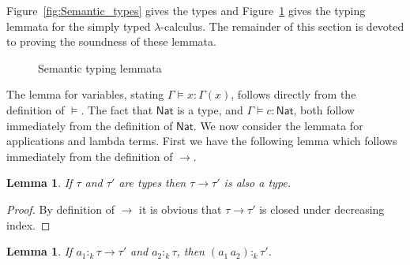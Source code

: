 \documentclass[10pt,a4paper,final,twocolumn]{article}
\theoremstyle{definition}
\theoremstyle{plain}
\newtheorem{lemma}[definition]{Lemma}
\newcommand{\abstr}[2]{\ensuremath{\lambda{#1}.\,{#2}}}
\newcommand{\app}[2]{\ensuremath{{#1}\,{#2}}}
\newcommand{\Nat}{\ensuremath{\mathsf{Nat}}}
\begin{document}
Figure~\ref{fig:Semantic_types} gives the types and Figure~\ref{fig:Semantic_typing_lemmata} gives the
typing lemmata for the simply typed $\lambda$-calculus.
The remainder of this section is devoted to proving the soundness of these lemmata.
\begin{figure}[htb]
  \centering
  \caption{Semantic typing lemmata}
  \label{fig:Semantic_typing_lemmata}
\end{figure}

The lemma for variables, stating \mbox{$\Gamma \models x : \Gamma(x)$}, follows directly from the definition of
$\models$. The fact that $\Nat$ is a type, and \mbox{$\Gamma \models c : \Nat$},
both follow immediately from the definition of $\Nat$. We now consider the lemmata for
applications and lambda terms. First we have the following lemma which follows immediately
from the definition of $\to$.
\begin{lemma}
  If $\tau$ and $\tau'$ are types then \mbox{$\tau \to \tau'$} is also a type.
\end{lemma}

\begin{proof}
  By definition of $\to$ it is obvious that \mbox{$\tau \to \tau'$} is closed
  under decreasing index.
\end{proof}

\begin{lemma} \label{lem:Application}
  If \mbox{$a_1 :_k \tau \to \tau'$} and \mbox{$a_2 :_k \tau$}, then \mbox{$(\app{a_1}{a_2}) :_k \tau'$}.
\end{lemma}
\end{document}

